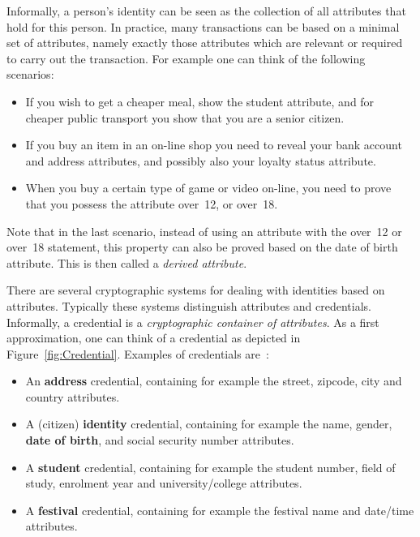 Informally, a person's identity can be seen as the collection
of all attributes that hold for this person. In practice, many
transactions can be based on a minimal set of attributes, namely exactly those
attributes which are relevant or required to carry out the transaction. For
example one can think of the following scenarios:
\begin{itemize}
  \item If you wish to get a cheaper meal, show the \textsf{student} attribute,
    and for cheaper public transport you show that you are a \textsf{senior
    citizen}.
  \item If you buy an item in an on-line shop you need to reveal your
    \textsf{bank account} and \textsf{address} attributes, and possibly also
    your \textsf{loyalty status} attribute.
  \item When you buy a certain type of game or video on-line, you need to
    prove that you possess the attribute \textsf{over~12}, or \textsf{over~18}.
\end{itemize}
Note that in the last scenario, instead of using an attribute with the
\textsf{over~12} or \textsf{over~18} statement,
 this property can also be proved
based on the \textsf{date of birth} attribute. This is then called a
\emph{derived attribute}.

There are several cryptographic systems for dealing with identities
 based on attributes. Typically these systems
distinguish attributes and credentials. Informally, a credential
 is a \emph{cryptographic container  of attributes}. As a first approximation, one can think of a
credential as depicted in Figure~\ref{fig:Credential}. Examples of credentials
are~\cite{AlparJacobs2013}:
\begin{itemize}
  \item An \textbf{address} credential, containing for example the 
    \textsf{street}, \textsf{zipcode}, \textsf{city} and \textsf{country} 
    attributes.
  \item A (citizen) \textbf{identity} credential, containing for example the 
    \textsf{name}, \textsf{gender}, \textbf{date of birth}, and \textsf{social
    security number} attributes.
  \item A \textbf{student} credential, containing for example the 
    \textsf{student number}, \textsf{field of study}, \textsf{enrolment year} 
    and \textsf{university/college} attributes.
  \item A \textbf{festival} credential, containing for example the \textsf{festival name} and \textsf{date/time} attributes.
\end{itemize}

